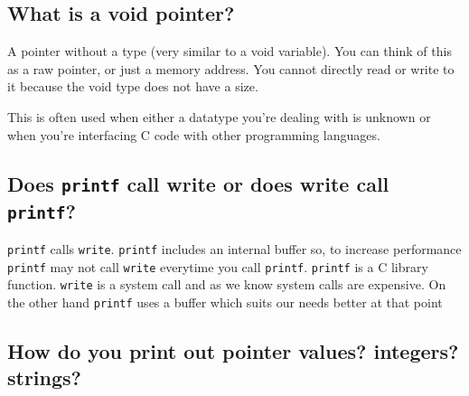 \begin{Shaded}
\end{Shaded}

\subsection{What is a void pointer?}\label{what-is-a-void-pointer}

A pointer without a type (very similar to a void variable). You can
think of this as a raw pointer, or just a memory address. You cannot
directly read or write to it because the void type does not have a size.

This is often used when either a datatype you're dealing with is unknown
or when you're interfacing C code with other programming languages.

\subsection{\texorpdfstring{Does \texttt{printf} call write or does
write call
\texttt{printf}?}{Does printf call write or does write call printf?}}\label{does-printf-call-write-or-does-write-call-printf}

\texttt{printf} calls \texttt{write}. \texttt{printf} includes an
internal buffer so, to increase performance \texttt{printf} may not call
\texttt{write} everytime you call \texttt{printf}. \texttt{printf} is a
C library function. \texttt{write} is a system call and as we know
system calls are expensive. On the other hand \texttt{printf} uses a
buffer which suits our needs better at that point

\subsection{How do you print out pointer values? integers?
strings?}\label{how-do-you-print-out-pointer-values-integers-strings}

